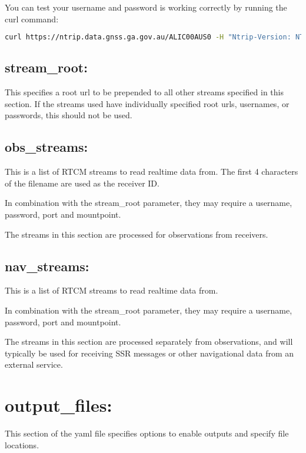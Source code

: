 You can test your username and password is working correctly by running the curl command:
\begin{lstlisting}[language=bash]
curl https://ntrip.data.gnss.ga.gov.au/ALIC00AUS0 -H "Ntrip-Version: NTRIP/2.0" -i  --output - -u <user>
\end{lstlisting}

\subsection*{stream\_root:}
This specifies a root url to be prepended to all other streams specified in this section. If the streams used have individually specified root urls, usernames, or passwords, this should not be used.

\subsection*{obs\_streams:}
This is a list of RTCM streams to read realtime data from. The first 4 characters of the filename are used as the receiver ID.

In combination with the stream\_root parameter, they may require a username, password, port and mountpoint.

The streams in this section are processed for observations from receivers.

\subsection*{nav\_streams:}
This is a list of RTCM streams to read realtime data from. 

In combination with the stream\_root parameter, they may require a username, password, port and mountpoint.

The streams in this section are processed separately from observations, and will typically be used for receiving SSR messages or other navigational data from an external service.










\section{output\_files:}
This section of the yaml file specifies options to enable outputs and specify file locations.

